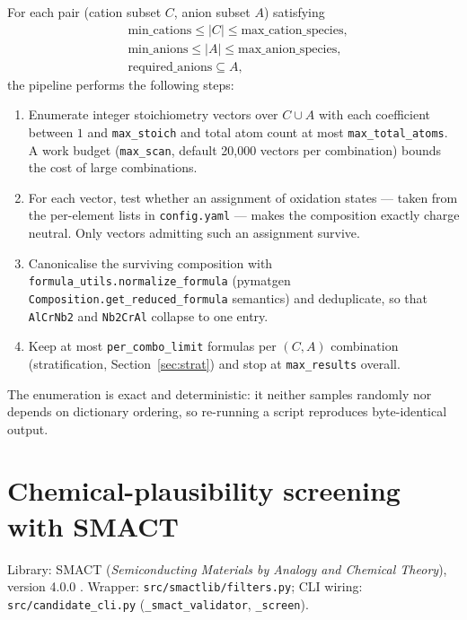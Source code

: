\documentclass[11pt,a4paper]{article}
\newcommand{\pkg}[1]{\texttt{#1}}
\newcommand{\code}[1]{\texttt{#1}}
\begin{document}
For each pair (cation subset $C$, anion subset $A$) satisfying
\[
\begin{aligned}
  &\text{min\_cations} \le |C| \le \text{max\_cation\_species},\\
  &\text{min\_anions} \le |A| \le \text{max\_anion\_species},\\
  &\text{required\_anions} \subseteq A,
\end{aligned}
\]
the pipeline performs the following steps:

\begin{enumerate}[label=\arabic*.]
  \item Enumerate integer stoichiometry vectors over $C \cup A$ with each coefficient between
        $1$ and \code{max\_stoich} and total atom count at most \code{max\_total\_atoms}. A work
        budget (\code{max\_scan}, default 20{,}000 vectors per combination) bounds the cost of
        large combinations.
  \item For each vector, test whether an assignment of oxidation states --- taken from the
        per-element lists in \code{config.yaml} --- makes the composition exactly charge neutral.
        Only vectors admitting such an assignment survive.
  \item Canonicalise the surviving composition with \code{formula\_utils.normalize\_formula}
        (pymatgen~\cite{pymatgen} \code{Composition.get\_reduced\_formula} semantics) and
        deduplicate, so that \code{AlCrNb2} and \code{Nb2CrAl} collapse to one entry.
  \item Keep at most \code{per\_combo\_limit} formulas per $(C,A)$ combination (stratification,
        Section~\ref{sec:strat}) and stop at \code{max\_results} overall.
\end{enumerate}

The enumeration is exact and deterministic: it neither samples randomly nor depends on dictionary
ordering, so re-running a script reproduces byte-identical output.

\section{Chemical-plausibility screening with SMACT}

Library: SMACT (\emph{Semiconducting Materials by Analogy and Chemical Theory}), version 4.0.0
\cite{smact_joss,smact_chem}. Wrapper: \pkg{src/smactlib/filters.py}; CLI wiring:
\pkg{src/candidate\_cli.py} (\code{\_smact\_validator}, \code{\_screen}).
\end{document}
